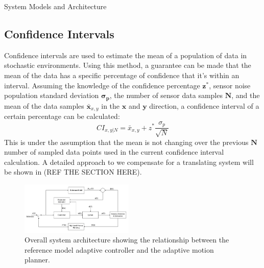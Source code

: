 \begin{section}{System Models and Architecture}
 \subsection{Confidence Intervals}

Confidence intervals are used to estimate the mean of a population of data in stochastic environments. Using this method, a guarantee can be made that the mean of the data has a specific percentage of confidence that it's within an interval. Assuming the knowledge of the confidence percentage $ \bm{z^{*}} $, sensor noise population standard deviation $ \bm{\sigma_p} $, the number of sensor data samples $ \bm{N} $, and the mean of the data samples $ \bm{\bar{x}}_{x,y} $ in the $\bm{x}$ and $\bm{y}$ direction, a confidence interval of a certain percentage can be calculated: 
 	\begin{equation}
		CI_{x,y|N} = \bar{x}_{x,y} + z^{*}\frac{\sigma_p}{\sqrt{N}}
	\end{equation}
This is under the assumption that the mean is not changing over the previous $\bm{N}$ number of sampled data points used in the current confidence interval calculation. A detailed approach to we compensate for a translating system will be shown in (REF THE SECTION HERE).



\begin{figure}
\vspace{1pt}
\centering
\includegraphics[width=0.48\textwidth]{sys_arch.png}
\caption{Overall system architecture showing the relationship between the reference model adaptive controller and the adaptive motion planner.}
\label{fig:system_arch}
\end{figure}



\end{section}